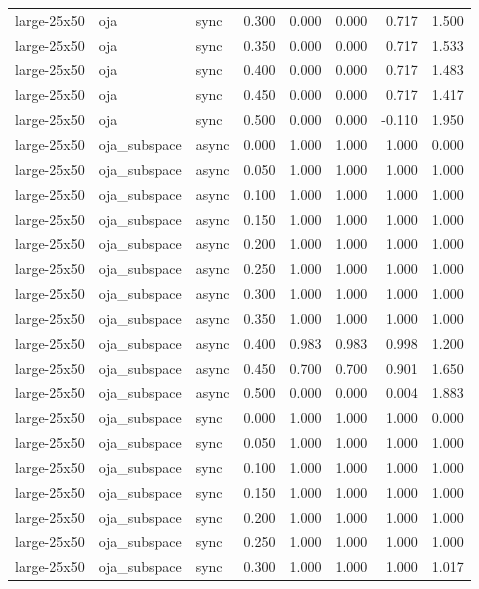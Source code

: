 \begin{tabular}{lllrrrrr}
large-25x50 & oja & sync & 0.300 & 0.000 & 0.000 & 0.717 & 1.500 \\
large-25x50 & oja & sync & 0.350 & 0.000 & 0.000 & 0.717 & 1.533 \\
large-25x50 & oja & sync & 0.400 & 0.000 & 0.000 & 0.717 & 1.483 \\
large-25x50 & oja & sync & 0.450 & 0.000 & 0.000 & 0.717 & 1.417 \\
large-25x50 & oja & sync & 0.500 & 0.000 & 0.000 & -0.110 & 1.950 \\
large-25x50 & oja\_subspace & async & 0.000 & 1.000 & 1.000 & 1.000 & 0.000 \\
large-25x50 & oja\_subspace & async & 0.050 & 1.000 & 1.000 & 1.000 & 1.000 \\
large-25x50 & oja\_subspace & async & 0.100 & 1.000 & 1.000 & 1.000 & 1.000 \\
large-25x50 & oja\_subspace & async & 0.150 & 1.000 & 1.000 & 1.000 & 1.000 \\
large-25x50 & oja\_subspace & async & 0.200 & 1.000 & 1.000 & 1.000 & 1.000 \\
large-25x50 & oja\_subspace & async & 0.250 & 1.000 & 1.000 & 1.000 & 1.000 \\
large-25x50 & oja\_subspace & async & 0.300 & 1.000 & 1.000 & 1.000 & 1.000 \\
large-25x50 & oja\_subspace & async & 0.350 & 1.000 & 1.000 & 1.000 & 1.000 \\
large-25x50 & oja\_subspace & async & 0.400 & 0.983 & 0.983 & 0.998 & 1.200 \\
large-25x50 & oja\_subspace & async & 0.450 & 0.700 & 0.700 & 0.901 & 1.650 \\
large-25x50 & oja\_subspace & async & 0.500 & 0.000 & 0.000 & 0.004 & 1.883 \\
large-25x50 & oja\_subspace & sync & 0.000 & 1.000 & 1.000 & 1.000 & 0.000 \\
large-25x50 & oja\_subspace & sync & 0.050 & 1.000 & 1.000 & 1.000 & 1.000 \\
large-25x50 & oja\_subspace & sync & 0.100 & 1.000 & 1.000 & 1.000 & 1.000 \\
large-25x50 & oja\_subspace & sync & 0.150 & 1.000 & 1.000 & 1.000 & 1.000 \\
large-25x50 & oja\_subspace & sync & 0.200 & 1.000 & 1.000 & 1.000 & 1.000 \\
large-25x50 & oja\_subspace & sync & 0.250 & 1.000 & 1.000 & 1.000 & 1.000 \\
large-25x50 & oja\_subspace & sync & 0.300 & 1.000 & 1.000 & 1.000 & 1.017 \\

\end{tabular}
